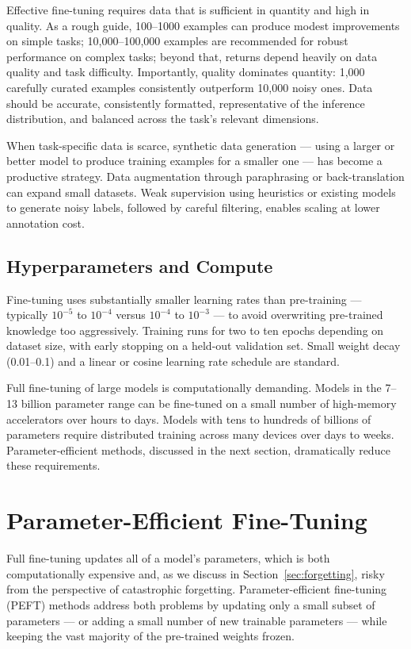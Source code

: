 \documentclass{book}
\begin{document}
Effective fine-tuning requires data that is sufficient in quantity and
high in quality. As a rough guide, 100--1000 examples can produce modest
improvements on simple tasks; 10,000--100,000 examples are recommended for
robust performance on complex tasks; beyond that, returns depend heavily
on data quality and task difficulty. Importantly, quality dominates
quantity: 1,000 carefully curated examples consistently outperform 10,000
noisy ones. Data should be accurate, consistently formatted, representative
of the inference distribution, and balanced across the task's relevant
dimensions.

When task-specific data is scarce, synthetic data generation --- using a
larger or better model to produce training examples for a smaller one ---
has become a productive strategy. Data augmentation through paraphrasing
or back-translation can expand small datasets. Weak supervision using
heuristics or existing models to generate noisy labels, followed by
careful filtering, enables scaling at lower annotation cost.

\subsection{Hyperparameters and Compute}
\label{sec:sft_hparams}

Fine-tuning uses substantially smaller learning rates than pre-training
--- typically $10^{-5}$ to $10^{-4}$ versus $10^{-4}$ to $10^{-3}$ ---
to avoid overwriting pre-trained knowledge too aggressively. Training
runs for two to ten epochs depending on dataset size, with early stopping
on a held-out validation set. Small weight decay (0.01--0.1) and a linear
or cosine learning rate schedule are standard.

Full fine-tuning of large models is computationally demanding. Models in
the 7--13 billion parameter range can be fine-tuned on a small number of
high-memory accelerators over hours to days. Models with tens to hundreds
of billions of parameters require distributed training across many devices
over days to weeks. Parameter-efficient methods, discussed in the next
section, dramatically reduce these requirements.

\section{Parameter-Efficient Fine-Tuning}
\label{sec:peft}

Full fine-tuning updates all of a model's parameters, which is both
computationally expensive and, as we discuss in
Section~\ref{sec:forgetting}, risky from the perspective of catastrophic
forgetting. Parameter-efficient fine-tuning (PEFT) methods address both
problems by updating only a small subset of parameters --- or adding a
small number of new trainable parameters --- while keeping the vast
majority of the pre-trained weights frozen.
\end{document}
